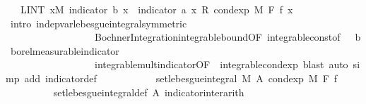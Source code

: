 \begin{isabellebody}
\ {\isachardoublequoteopen}{\isachardot}{\kern0pt}{\isachardot}{\kern0pt}{\isachardot}{\kern0pt}\ {\isacharequal}{\kern0pt}\ {\isacharparenleft}{\kern0pt}LINT\ x{\isacharbar}{\kern0pt}M{\isachardot}{\kern0pt}\ indicator\ b\ x\ {\isacharasterisk}{\kern0pt}\ {\isacharparenleft}{\kern0pt}indicator\ a\ x\ {\isacharasterisk}{\kern0pt}\isactrlsub R\ cond{\isacharunderscore}{\kern0pt}exp\ M\ F\ f\ x{\isacharparenright}{\kern0pt}{\isacharparenright}{\kern0pt}{\isachardoublequoteclose}\isanewline
\ \ \ \ \ \ \ \ \isamarkupfalse%
\ {\isacharparenleft}{\kern0pt}intro\ indep{\isacharunderscore}{\kern0pt}var{\isacharunderscore}{\kern0pt}lebesgue{\isacharunderscore}{\kern0pt}integral{\isacharbrackleft}{\kern0pt}symmetric{\isacharbrackright}{\kern0pt}\isanewline
\ \ \ \ \ \ \ \ \ \ \ \ \ \ \ \ \ \ Bochner{\isacharunderscore}{\kern0pt}Integration{\isachardot}{\kern0pt}integrable{\isacharunderscore}{\kern0pt}bound{\isacharbrackleft}{\kern0pt}OF\ integrable{\isacharunderscore}{\kern0pt}const{\isacharbrackleft}{\kern0pt}of\ {\isachardoublequoteopen}{}\ {\isacharcolon}{\kern0pt}{\isacharcolon}{\kern0pt}\ {\isacharprime}{\kern0pt}b{\isachardoublequoteclose}{\isacharbrackright}{\kern0pt}\ borel{\isacharunderscore}{\kern0pt}measurable{\isacharunderscore}{\kern0pt}indicator{\isacharbrackright}{\kern0pt}\isanewline
\ \ \ \ \ \ \ \ \ \ \ \ \ \ \ \ \ \ integrable{\isacharunderscore}{\kern0pt}mult{\isacharunderscore}{\kern0pt}indicator{\isacharbrackleft}{\kern0pt}OF\ {\isacharunderscore}{\kern0pt}\ integrable{\isacharunderscore}{\kern0pt}cond{\isacharunderscore}{\kern0pt}exp{\isacharbrackright}{\kern0pt}{\isacharcomma}{\kern0pt}\ blast{\isacharparenright}{\kern0pt}\ {\isacharparenleft}{\kern0pt}auto\ simp\ add{\isacharcolon}{\kern0pt}\ indicator{\isacharunderscore}{\kern0pt}def{\isacharparenright}{\kern0pt}\isanewline
\ \ \ \ \ \ \isamarkupfalse%
\ \isamarkupfalse%
\ {\isachardoublequoteopen}{\isachardot}{\kern0pt}{\isachardot}{\kern0pt}{\isachardot}{\kern0pt}\ {\isacharequal}{\kern0pt}\ set{\isacharunderscore}{\kern0pt}lebesgue{\isacharunderscore}{\kern0pt}integral\ M\ A\ {\isacharparenleft}{\kern0pt}cond{\isacharunderscore}{\kern0pt}exp\ M\ F\ f{\isacharparenright}{\kern0pt}{\isachardoublequoteclose}\ \isanewline
\ \ \ \ \ \ \ \ \isamarkupfalse%
\ set{\isacharunderscore}{\kern0pt}lebesgue{\isacharunderscore}{\kern0pt}integral{\isacharunderscore}{\kern0pt}def\ A\ indicator{\isacharunderscore}{\kern0pt}inter{\isacharunderscore}{\kern0pt}arith\ \isanewline
\ \ \ \ \ \ \ \ \isamarkupfalse%

\end{isabellebody}
